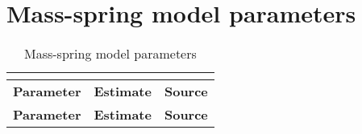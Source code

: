 \section{Mass-spring model parameters}
\label{appendix:MassSpringParameters}

\begin{longtable}{lrl}
\caption{Mass-spring model parameters}\\
\label{table:MassSpringParameters}\\

\toprule
\multicolumn{1}{l}{\textbf{Parameter}}&
\multicolumn{1}{r}{\textbf{Estimate}} &
\multicolumn{1}{l}{\textbf{Source}}\\
\midrule

\endfirsthead

\toprule
\multicolumn{1}{l}{\textbf{Parameter}}&
\multicolumn{1}{r}{\textbf{Estimate}} &
\multicolumn{1}{l}{\textbf{Source}}\\
\midrule
\endhead %


\end{longtable}
